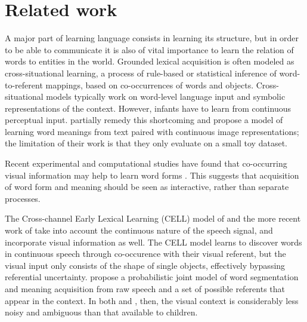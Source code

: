 \section{Related work}
A major part of learning language consists in learning its structure,
but in order to be able to communicate it is also of vital importance
to learn the relation of words to entities in the
world. %
Grounded lexical acquisition is often modeled as cross-situational
learning, a process of rule-based \cite{siskind.96} or statistical
\cite{fazly.etal.10csj,frank.etal.07} inference of word-to-referent
mappings, based on co-occurrences of words and objects.
Cross-situational models typically work on word-level language input
and symbolic representations of the context. However, infants have to
learn from continuous perceptual input. 
 partially remedy this shortcoming
and propose a model of learning word
meanings from text paired with continuous image representations; the
limitation of their work is that they only evaluate on a small toy
dataset.

Recent experimental and computational studies have found that co-occurring visual information may help to learn word forms \cite{thiessen2010effects,Cunillera2010295,Glicksohn2013,Yurofsky2012statistical}. This suggests that acquisition of word form and meaning should be seen as interactive, rather than separate processes.

The Cross-channel Early Lexical Learning (CELL) model of  and the more recent work of  take into account the continuous nature of the speech signal, and incorporate visual information as well. The CELL model learns to discover words in continuous speech through co-occurence with their visual referent, but the visual input only consists of the shape of single objects, effectively bypassing referential uncertainty.  propose a probabilistic joint model of word segmentation and meaning acquisition from raw speech and a set of possible referents that appear in the context. In both  and , then, the visual context is considerably less noisy and ambiguous than that available to children.


